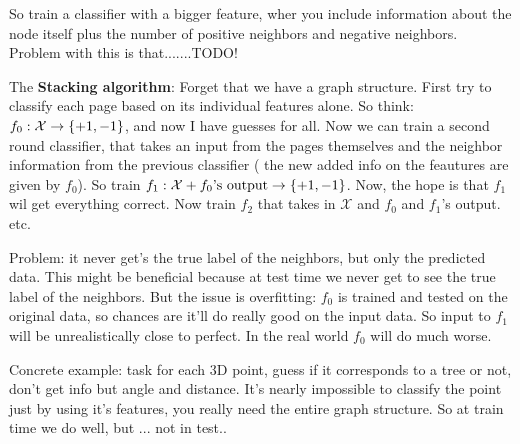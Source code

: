 So train a classifier with a bigger feature, wher you include
information about the node itself plus the number of positive
neighbors and negative neighbors. Problem with this is that.......TODO!

The \textbf{Stacking algorithm}: Forget that we have a graph structure. First try
to classify each page based on its individual features alone. So
think: $f_0:\mathcal{X}\rightarrow \{+1, -1\}$, and now I have guesses for
all.
Now we can train a second round classifier, that takes an input from
the pages themselves and the neighbor information from the previous
classifier ( the new added info on the feautures are given by
$f_0$). So train $f_1:\mathcal{X}+f_0\text{'s output}\rightarrow
\{+1,-1\}$. Now, the hope is that $f_1$ wil get everything correct.
Now train $f_2$ that takes in $\mathcal{X}$ and $f_0$ and $f_1$'s
output. etc.

Problem: it never get's the true label of the neighbors, but only the
predicted data. This might be beneficial because at test time we never get to see
the true label of the neighbors. But the issue is overfitting: $f_0$
is trained and tested on the original data, so chances are it'll do
really good on the input data. So input to $f_1$ will be
unrealistically close to perfect. In the real world $f_0$ will do much
worse.

Concrete example: task for each 3D point, guess if it corresponds to a
tree or not, don't get info but angle and distance. It's nearly
impossible to classify the point just by using it's features, you
really need the entire graph structure. So at train time we do well,
but ... not in test..

